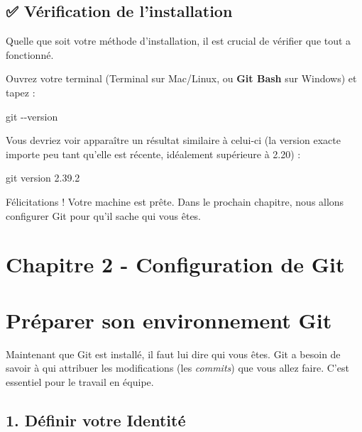 \documentclass[
  letterpaper,
  DIV=11,
  numbers=noendperiod]{scrreprt}
\newenvironment{Shaded}{\begin{snugshade}}{\end{snugshade}}
\newcommand{\AttributeTok}[1]{\textcolor[rgb]{0.40,0.45,0.13}{#1}}
\newcommand{\FunctionTok}[1]{\textcolor[rgb]{0.28,0.35,0.67}{#1}}
\newcommand{\NormalTok}[1]{\textcolor[rgb]{0.00,0.23,0.31}{#1}}
\begin{document}
\subsection{✅ Vérification de
l'installation}\label{vuxe9rification-de-linstallation}

Quelle que soit votre méthode d'installation, il est crucial de vérifier
que tout a fonctionné.

Ouvrez votre terminal (Terminal sur Mac/Linux, ou \textbf{Git Bash} sur
Windows) et tapez :

\begin{Shaded}
\begin{Highlighting}[]
\FunctionTok{git} \AttributeTok{{-}{-}version}
\end{Highlighting}
\end{Shaded}

Vous devriez voir apparaître un résultat similaire à celui-ci (la
version exacte importe peu tant qu'elle est récente, idéalement
supérieure à 2.20) :

\begin{Shaded}
\begin{Highlighting}[]
\NormalTok{git version 2.39.2}
\end{Highlighting}
\end{Shaded}

Félicitations ! Votre machine est prête. Dans le prochain chapitre, nous
allons configurer Git pour qu'il sache qui vous êtes.


\section{Chapitre 2 - Configuration de
Git}\label{chapitre-2---configuration-de-git}


\section{Préparer son environnement
Git}\label{pruxe9parer-son-environnement-git}

Maintenant que Git est installé, il faut lui dire qui vous êtes. Git a
besoin de savoir à qui attribuer les modifications (les \emph{commits})
que vous allez faire. C'est essentiel pour le travail en équipe.

\subsection{1. Définir votre
Identité}\label{duxe9finir-votre-identituxe9}
\end{document}
